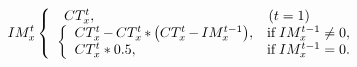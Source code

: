 \documentclass{article}
\begin{document}
	\[
	IM_x^t\left\{
	\begin{array}{l}
	\begin{array}{>{$}p{4.8cm}<{$}l}
	CT_x^t,&(t=1)\\
	\end{array}	\\
	\left\{\begin{array}{>{$}p{4.5cm}<{$}l}
	CT_x^t- CT_x^t \ast \bigl( CT_x^t - IM_x^{t-1} \bigr), & \text{if} \; IM_x^{t-1} \neq 0, \\
	CT_x^t \ast 0.5, & \text{if} \; IM_x^{t-1}=0.
	\end{array}\right. 
	\end{array}\right.
	\]
\end{document}
